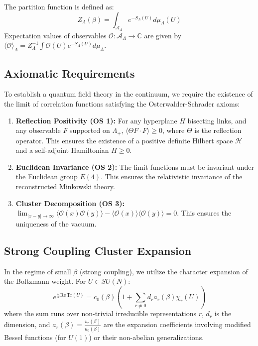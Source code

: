 The partition function is defined as:
\begin{equation}
Z_\Lambda(\beta) = \int_{\mathcal{A}_\Lambda} e^{-S_\Lambda(U)} d\mu_\Lambda(U)
\end{equation}
Expectation values of observables $\mathcal{O}: \mathcal{A}_\Lambda \to \mathbb{C}$ are given by $\langle \mathcal{O} \rangle_\Lambda = Z_\Lambda^{-1} \int \mathcal{O}(U) e^{-S_\Lambda(U)} d\mu_\Lambda$.

\subsection{Axiomatic Requirements}
To establish a quantum field theory in the continuum, we require the existence of the limit of correlation functions satisfying the Osterwalder-Schrader axioms:
\begin{enumerate}
    \item \textbf{Reflection Positivity (OS 1):} For any hyperplane $H$ bisecting links, and any observable $F$ supported on $\Lambda_+$, $\langle \Theta F \cdot F \rangle \ge 0$, where $\Theta$ is the reflection operator. This ensures the existence of a positive definite Hilbert space $\mathcal{H}$ and a self-adjoint Hamiltonian $H \ge 0$.
    \item \textbf{Euclidean Invariance (OS 2):} The limit functions must be invariant under the Euclidean group $E(4)$. This ensures the relativistic invariance of the reconstructed Minkowski theory.
    \item \textbf{Cluster Decomposition (OS 3):} $\lim_{|x-y|\to\infty} \langle \mathcal{O}(x) \mathcal{O}(y) \rangle - \langle \mathcal{O}(x) \rangle \langle \mathcal{O}(y) \rangle = 0$. This ensures the uniqueness of the vacuum.
\end{enumerate}

\subsection{Strong Coupling Cluster Expansion}
In the regime of small $\beta$ (strong coupling), we utilize the character expansion of the Boltzmann weight. For $U \in SU(N)$:
\begin{equation}
e^{\frac{\beta}{N} \mathrm{Re}\,\mathrm{Tr}(U)} = c_0(\beta) \left( 1 + \sum_{r \neq 0} d_r a_r(\beta) \chi_r(U) \right)
\end{equation}
where the sum runs over non-trivial irreducible representations $r$, $d_r$ is the dimension, and $a_r(\beta) = \frac{u_r(\beta)}{u_0(\beta)}$ are the expansion coefficients involving modified Bessel functions (for $U(1)$) or their non-abelian generalizations.

